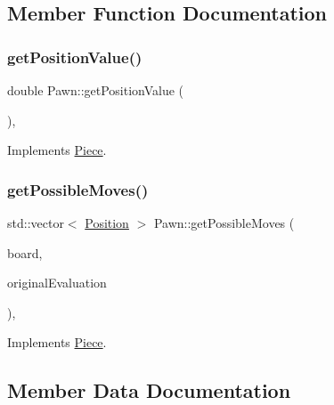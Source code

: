 \subsection{Member Function Documentation}
\mbox{\label{class_pawn_a332e70ab65f480521428aa87c7cd2ef9}} 
\subsubsection{\texorpdfstring{get\+Position\+Value()}{getPositionValue()}}
{\footnotesize\ttfamily double Pawn\+::get\+Position\+Value (\begin{DoxyParamCaption}{ }\end{DoxyParamCaption})\hspace{0.3cm}{\ttfamily [override]}, {\ttfamily [virtual]}}



Implements \hyperlink{class_piece_a4adfa58b4f0368c9a5859afcf294e0a4}{Piece}.

\mbox{\label{class_pawn_a54eddd8724008c910f34c5c49374d5c5}} 
\subsubsection{\texorpdfstring{get\+Possible\+Moves()}{getPossibleMoves()}}
{\footnotesize\ttfamily std\+::vector$<$ \hyperlink{struct_position}{Position} $>$ Pawn\+::get\+Possible\+Moves (\begin{DoxyParamCaption}\item[{const std\+::shared\+\_\+ptr$<$ \hyperlink{class_base_board}{Base\+Board} $>$}]{board,  }\item[{bool}]{original\+Evaluation }\end{DoxyParamCaption})\hspace{0.3cm}{\ttfamily [override]}, {\ttfamily [virtual]}}



Implements \hyperlink{class_piece_a8891924c280568529878549f59541925}{Piece}.



\subsection{Member Data Documentation}
\mbox{\label{class_pawn_aac8df37fd58c41fe91460325e5447464}} 
